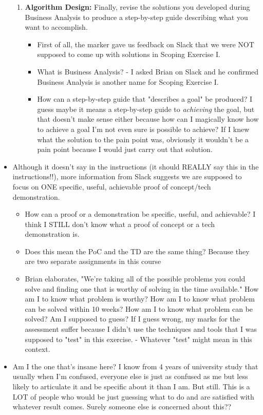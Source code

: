 \documentclass[12pt]{article}
\begin{document}
\begin{itemize}
\begin{enumerate}
        \item \textbf{Algorithm Design:} Finally, revise the solutions you developed during Business Analysis to produce a step-by-step guide describing what you want to accomplish.
        \begin{itemize}
            \item First of all, the marker gave us feedback on Slack that we were NOT supposed to come up with solutions in Scoping Exercise I.
            \item What is Business Analysis? - I asked Brian on Slack and he confirmed Business Analysis is another name for Scoping Exercise I.
            \item How can a step-by-step guide that "describes a goal" be produced? I guess maybe it means a step-by-step guide to \textit{achieving} the goal, but that doesn't make sense either because how can I magically know how to achieve a goal I'm not even sure is possible to achieve? If I knew what the solution to the pain point was, obviously it wouldn't be a pain point because I would just carry out that solution. 
        \end{itemize}
    \end{enumerate}
    \item Although it doesn't say in the instructions (it should REALLY say this in the instructions!!), more information from Slack suggests we are supposed to focus on ONE specific, useful, achievable proof of concept/tech demonstration.
    \begin{itemize}
        \item How can a proof or a demonstration be specific, useful, and achievable? I think I STILL don't know what a proof of concept or a tech demonstration is.
        \item Does this mean the PoC and the TD are the same thing? Because they are two separate assignments in this course
        \item Brian elaborates, "We're taking all of the possible problems you could solve and finding one that is worthy of solving in the time available." How am I to know what problem is worthy? How am I to know what problem can be solved within 10 weeks? How am I to know what problem can be solved? Am I supposed to guess? If I guess wrong, my marks for the assessment suffer because I didn't use the techniques and tools that I was supposed to "test" in this exercise. - Whatever "test" might mean in this context.
    \end{itemize}
    \item Am I the one that's insane here? I know from 4 years of university study that usually when I'm confused, everyone else is just as confused as me but less likely to articulate it and be specific about it than I am. But still. This is a LOT of people who would be just guessing what to do and are satisfied with whatever result comes. Surely someone else is concerned about this??
\end{itemize}
\end{document}
